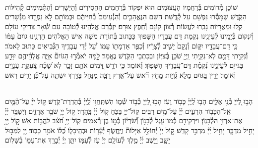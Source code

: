 \documentclass[twoside, openany, parskip=half, 11pt]{book}
\begin{document}
\\
שׁוֹכֵן מְ֯רוֹמִים בְּ֯רַחֲמָיו הָעֲצוּמִים הוּא יִפְקוֹד בְּ֯רַחֲמִים הַחֲסִידִים וְ֯הַיְשָׁרִים וְ֯הַתְּ֯מִימִים קְ֯הִילּוֹת הַקֹּֽדֶשׁ שֶׁמָּסְ֯רוּ נַפְשָׁם עַל קְ֯דֻשַּׁת הַשֵּׁם הַנֶּאֱהָבִ֤ים וְ֯הַנְּ֯עִימִם֙ בְּ֯חַיֵּיהֶ֔ם וּבְמוֹתָ֖ם לֹ֣א נִפְרָ֑דוּ׃ מִנְּ֯שָׁרִים קַֽלּוּ וּמֵאֲרָיוֹת גָּבֵֽרוּ לַעֲשׂוֹת רְ֯צוֹן קוֹנָם וְ֯חֵֽפֶץ צוּרָם׃ יִזְכְּ֯רֵם אֱלֹהֵֽינוּ לְ֯טוֹבָה עִם שְׁ֯אָר צַדִּיקֵי עוֹלָם וְ֯יִנְקוֹם בְּ֯יָמֵֽינוּ לְ֯עֵינֵֽינוּ נִקְמַת דַּם עֲבָדָיו הַשָּׁפוּךְ כַּכָּתוּב בְּ֯תוֹרַת מֹשֶׁה אִישׁ הָאֱלֹהִים׃ הַרְנִ֤ינוּ גוֹיִם֙ עַמּ֔וֹ כִּ֥י דַם־עֲבָדָ֖יו יִקּ֑וֹם וְ֯נָקָם֙ יָשִׁ֣יב לְ֯צָרָ֔יו וְ֯כִפֶּ֥ר אַדְמָת֖וֹ עַמּֽוֹ׃ וְ֯עַל יְ֯דֵי עֲבָדֶֽיךָ הַנְּ֯בִיאִים כָּתוּב לֵאמֹר׃ וְ֯נִקֵּ֖יתִי דָּמָ֣ם לֹֽא־נִקֵּ֑יתִי וַֽיְיָ֖ שֹׁכֵ֥ן בְּ֯צִיּֽוֹן׃ וּבְכִתְבֵי הַקֹּֽדֶשׁ נֶאֱמַר׃ לׇׇׇׇ֤מָּה יֹֽאמְ֯ר֣וּ הַגּוֹיִם֘ אַיֵּ֢ה אֱלֹֽהֵ֫יהֶ֥ם יִוָּדַ֣ע בַּגֹּייִ֣ם לְ֯עֵינֵ֑ינוּ נִ֝קְמַ֗ת דַּם־עֲבָדֶ֥יךָ הַשָּׁפֽוּךְ׃ וְ֯אוֹמֵר׃ כִּ֤י דֹרֵ֣שׁ דָּ֭מִים אֹתָ֣ם זָכָ֑ר לֹ֥א שָׁ֝כַ֗ח צַֽעֲקַ֥ת עֲנָוִֽים׃ וְ֯אוֹמֵר׃ יָדִ֣ין בַּ֭גּוֹיִם מָלֵ֣א גְ֯וִיּ֑וֹת מָ֥חַץ רֹ֝֗אשׁ עַל־אֶ֥רֶץ רַבָּֽה׃ מִ֭נַּחַל בַּדֶּ֣רֶךְ יִשְׁתֶּ֑ה עַל־כֵּ֝֗ן יָרִ֥ים רֹֽאשׁ׃



\sepline

\ashrei

\yehalelu

\\
%
הָב֣וּ לַ֭יְיָ בְּ֯נֵ֣י אֵלִ֑ים הָב֥וּ לַֽ֝יְיָ֗ כָּב֥וֹד וָעֹֽז׃
הָב֣וּ לַ֭יְיָ כְּ֯ב֣וֹד שְׁ֯מ֑וֹ הִשְׁתַּֽחֲו֥וּ לַֽ֝יְיָ֗ בְּ֯הַדְרַת־קֹֽדֶשׁ׃
ק֥וֹל יְיָ֗ עַל־הַ֫מָּ֥יִם אֵֽל־הַכָּב֥וֹד הִרְעִ֑ים יְ֜יָ֗ עַל־מַ֥יִם רַבִּֽים׃
קֽוֹל־יְיָ֥ בַּכֹּ֑חַ ק֥וֹל יְ֜יָ֗ בֶּֽהָדָר׃
ק֣וֹל יְ֖יָ֥ שֹׁבֵ֣ר אֲרָזִ֑ים וַיְשַׁבֵּ֥ר יְ֜יָ֗ אֶת־אַרְזֵ֥י הַלְּ֯בָנֽוֹן׃
וַיַּרְקִידֵ֥ם כְּ֯מוֹ־עֵ֑גֶל לְ֯בָנ֥וֹן וְ֝֯שִׂרְי֗וֹן כְּ֯מ֣וֹ בֶן־רְ֯אֵמִֽים׃
קֽוֹל־יְיָ֥ חֹ֝צֵ֗ב לַֽהֲב֥וֹת אֵֽשׁ׃
ק֣וֹל יְ֖יָ֥ יָחִ֣יל מִדְבָּ֑ר יָחִ֥יל יְ֜יָ֗ מִדְבַּ֣ר קָדֵֽשׁ׃
ק֣וֹל יְיָ֙ יְ֯חוֹלֵ֣ל אַיָּלוֹת֘ וַיֶּֽחֱשׂ֢ף יְ֯עָ֫ר֥וֹת וּבְהֵֽיכָל֑וֹ כֻּ֝לּ֗וֹ אֹמֵ֥ר כָּבֽוֹד׃
יְ֖יָ לַמַּבּ֣וּל יָשָׁ֑ב וַיֵּ֥שֶׁב יְ֜יָ֗ מֶ֣לֶךְ לְ֯עוֹלָֽם׃
יְיָ֗ עֹ֖ז לְ֯עַמּ֣וֹ יִתֵּ֑ן יְיָ֓ יְ֯בָרֵ֖ךְ אֶת־עַמּ֣וֹ בַ֯שָּׁלֽוֹם׃
\end{document}
